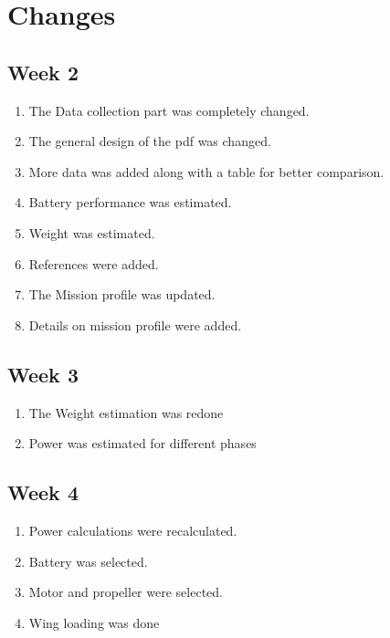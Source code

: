 \documentclass[12 pt]{article}
\begin{document}
\href{https://github.com/abhijeetmangela/Group_7_design.git}{}

\newpage

\section{Changes}

\subsection{Week 2}
\begin{enumerate}
    \item The Data collection part was completely changed.
    \item The general design of the pdf was changed.
    \item More data was added along with a table for better comparison.
    \item Battery performance was estimated.
    \item Weight was estimated.
    \item References were added.
    \item The Mission profile was updated.
    \item Details on mission profile were added.
\end{enumerate}

\subsection{Week 3}
\begin{enumerate}
    \item The Weight estimation was redone
    \item Power was estimated for different phases 
\end{enumerate}

\subsection{Week 4}
\begin{enumerate}
    \item Power calculations were recalculated.
    \item Battery was selected.
    \item Motor and propeller were selected.
    \item Wing loading was done
\end{enumerate}
\end{document}
